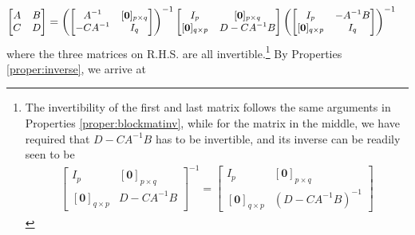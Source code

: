 \begin{align*}
\small
\begin{bmatrix}
A & B \\
C & D
\end{bmatrix}
&= 
\small
\left(\begin{bmatrix}
A^{-1} & [\textbf{0}]_{p\times q} \\
-CA^{-1} & I_q
\end{bmatrix}\right)^{-1}
\begin{bmatrix}
I_p & [\textbf{0}]_{p \times q} \\
[\textbf{0}]_{q\times p} & D - CA^{-1}B 
\end{bmatrix}
\left(\begin{bmatrix}
I_p & -A^{-1}B \\
[\textbf{0}]_{q \times p} & I_q
\end{bmatrix}\right)^{-1}
\end{align*}
where the three matrices on R.H.S. are all invertible.\footnote{The invertibility of the first and last matrix follows the same arguments in Properties \ref{proper:blockmatinv}, while for the matrix in the middle, we have required that $D-CA^{-1}B$ has to be invertible, and its inverse can be readily seen to be
\begin{align*}
\begin{bmatrix}
I_p & [\textbf{0}]_{p \times q} \\
[\textbf{0}]_{q\times p} & D - CA^{-1}B 
\end{bmatrix}^{-1}
=
\begin{bmatrix}
I_p & [\textbf{0}]_{p \times q} \\
[\textbf{0}]_{q\times p} & (D - CA^{-1}B)^{-1}
\end{bmatrix}
\end{align*}} By Properties \ref{proper:inverse}, we arrive at
